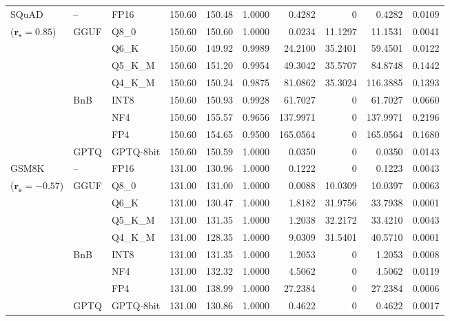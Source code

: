\begin{longtable}{ll l rrrrrrr}
\midrule
SQuAD & -- & FP16 & 150.60 & 150.48 & 1.0000 & 0.4282 & \cellcolor{cyan!12} $0$ & 0.4282 & 0.0109 \\
{\small ($\mathbf{r_s{=}0.85}$)} & GGUF & Q8\_0 & 150.60 & 150.60 & 1.0000 & 0.0234 & 11.1297 & 11.1531 & 0.0041 \\
 &  & Q6\_K & 150.60 & 149.92 & 0.9989 & 24.2100 & 35.2401 & 59.4501 & 0.0122 \\
 &  & Q5\_K\_M & 150.60 & 151.20 & 0.9954 & 49.3042 & 35.5707 & 84.8748 & 0.1442 \\
 &  & Q4\_K\_M & 150.60 & 150.24 & 0.9875 & 81.0862 & 35.3024 & 116.3885 & 0.1393 \\
 & BnB & INT8 & 150.60 & 150.93 & 0.9928 & 61.7027 & \cellcolor{cyan!12} $0$ & 61.7027 & 0.0660 \\
 &  & NF4 & 150.60 & 155.57 & 0.9656 & 137.9971 & \cellcolor{cyan!12} $0$ & 137.9971 & 0.2196 \\
 &  & FP4 & 150.60 & 154.65 & 0.9500 & 165.0564 & \cellcolor{cyan!12} $0$ & 165.0564 & 0.1680 \\
 & GPTQ & GPTQ-8bit & 150.60 & 150.59 & 1.0000 & 0.0350 & \cellcolor{cyan!12} $0$ & 0.0350 & 0.0143 \\
\midrule
GSM8K & -- & FP16 & 131.00 & 130.96 & 1.0000 & 0.1222 & \cellcolor{cyan!12} $0$ & 0.1223 & 0.0043 \\
{\small ($\mathbf{r_s{=}-0.57}$)} & GGUF & Q8\_0 & 131.00 & 131.00 & 1.0000 & 0.0088 & 10.0309 & 10.0397 & 0.0063 \\
 &  & Q6\_K & 131.00 & 130.47 & 1.0000 & 1.8182 & 31.9756 & 33.7938 & 0.0001 \\
 &  & Q5\_K\_M & 131.00 & 131.35 & 1.0000 & 1.2038 & 32.2172 & 33.4210 & 0.0043 \\
 &  & Q4\_K\_M & 131.00 & 128.35 & 1.0000 & 9.0309 & 31.5401 & 40.5710 & 0.0001 \\
 & BnB & INT8 & 131.00 & 131.35 & 1.0000 & 1.2053 & \cellcolor{cyan!12} $0$ & 1.2053 & 0.0008 \\
 &  & NF4 & 131.00 & 132.32 & 1.0000 & 4.5062 & \cellcolor{cyan!12} $0$ & 4.5062 & 0.0119 \\
 &  & FP4 & 131.00 & 138.99 & 1.0000 & 27.2384 & \cellcolor{cyan!12} $0$ & 27.2384 & 0.0006 \\
 & GPTQ & GPTQ-8bit & 131.00 & 130.86 & 1.0000 & 0.4622 & \cellcolor{cyan!12} $0$ & 0.4622 & 0.0017 \\
\end{longtable}
\endgroup